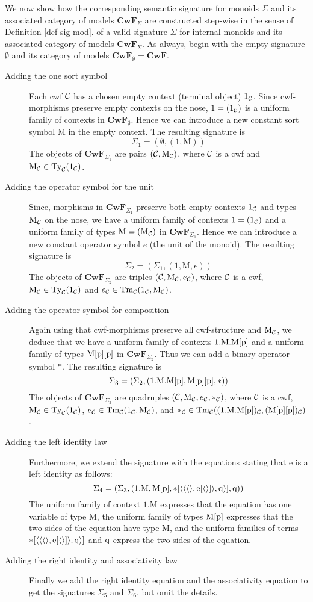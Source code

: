 \documentclass{lmcs}
\def\Cwf{\mathbf{CwF}}
\def\Mon{\mathrm{M}}
\def\idmon{\mathrm{e}}
\def\comp{\mathrm{*}}
\begin{document}
We now show how the corresponding semantic signature for monoids $\Sigma$ and its associated category of models $\Cwf_\Sigma$ are constructed step-wise in the sense of Definition \ref{def-sig-mod}. of a valid signature $\Sigma$ for internal monoids and its associated category of models $\Cwf_\Sigma$. As always, begin with the empty signature $\emptyset$ and its category of models $\Cwf_\emptyset = \Cwf$.
\begin{description}
\item[Adding the one sort symbol] Each cwf ${\mathcal C}$ has a chosen empty context (terminal object) $1_{\mathcal C}$. Since cwf-morphisms preserve empty contexts on the nose, $1 = (1_{\mathcal C})$ is a uniform family of contexts in $\Cwf_\emptyset$. Hence we can introduce a new constant sort symbol $\Mon$ in the empty context. The resulting signature  is
$$
\Sigma_1 = (\emptyset, (1,\Mon))
$$
The objects of $\Cwf_{\Sigma_1}$  are pairs $(\C,\Mon_\C)$, where ${\mathcal C}$ is a cwf and $\Mon_\C \in \Ty_\C(1_\C)$.
\item[Adding the operator symbol for the unit]
Since, morphisms in $\Cwf_{\Sigma_1}$ preserve both empty contexts $1_{\mathcal C}$ and types $\Mon_\C$ on the nose, we have a uniform family of contexts $1 = (1_{\mathcal C})$ and a uniform family of types $\Mon = (\Mon_\C)$ in $\Cwf_{\Sigma_1}$. Hence we can introduce a new constant operator symbol $e$ (the unit of the monoid).  The resulting signature  is
$$
\Sigma_2 = (\Sigma_1, (1,\Mon,e))
$$
The objects of $\Cwf_{\Sigma_2}$  are triples $(\C,\Mon_\C,e_\C)$, where ${\mathcal C}$ is a cwf, $\Mon_\C \in \Ty_\C(1_\C)$ and $e_\C \in \Tm_\C(1_\C,\Mon_\C)$.
\item[Adding the operator symbol for composition]
Again using that cwf-morphisms preserve all cwf-structure and $\Mon_\C$, we deduce that we have a uniform family of contexts $1.\Mon.\Mon[\p]$ and a uniform family of types $\Mon[\p][\p]$ in $\Cwf_{\Sigma_2}$. Thus we can add a binary operator symbol $\comp$. The resulting signature is
$$
\Sigma_3 = (\Sigma_2, (1.\Mon.\Mon[\p],\Mon[\p][\p],\comp))
$$
The objects of $\Cwf_{\Sigma_3}$  are quadruples $(\C,\Mon_\C,e_\C,*_\C)$, where ${\mathcal C}$ is a cwf, $\Mon_\C \in \Ty_\C(1_\C)$, $e_\C \in \Tm_\C(1_\C,\Mon_\C)$, and $*_\C \in \Tm_\C((1.\Mon.\Mon[\p])_\C,(\Mon[\p][\p])_\C)$.
\item[Adding the left identity law]
Furthermore, we extend the signature with the equations stating that $\idmon$ is a left identity as follows:
$$
\Sigma_4 = (\Sigma_3, (1.\Mon, \Mon[\p], \comp[\tuple{\tuple{\tuple{},\idmon[\tuple{}]},\q}], \q))
$$
The uniform family of context $1.\Mon$ expresses that the equation has one variable of type $\Mon$, the uniform family of types $\Mon[\p]$ expresses that the two sides of the equation have type $\Mon$, and the uniform families of terms $\comp[\tuple{\tuple{\tuple{},\idmon[\tuple{}]},\q}]$ and $\mathrm{q}$ express the two sides of the equation.
\item[Adding the right identity and associativity law]
Finally we add the right identity equation and the associativity equation to get the signatures $\Sigma_5$ and $\Sigma_6$, but omit the details. 
\end{description}
\end{document}
